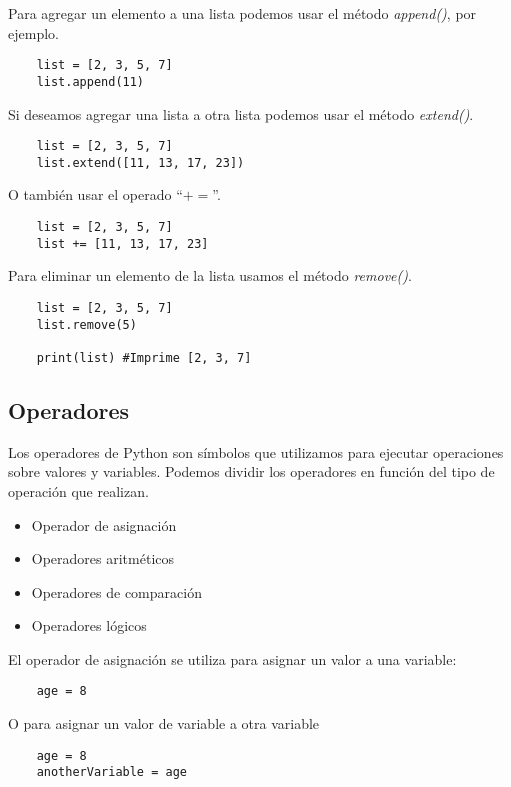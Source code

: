\documentclass[12pt]{article}
\begin{document}
    Para agregar un elemento a una lista podemos usar el método \textit{append()}, por ejemplo.
    \begin{lstlisting}
    list = [2, 3, 5, 7]
    list.append(11)
    \end{lstlisting}

    Si deseamos agregar una lista a otra lista podemos usar el método \textit{extend()}.
    \begin{lstlisting}
    list = [2, 3, 5, 7]
    list.extend([11, 13, 17, 23])
    \end{lstlisting}

    O también usar el operado ``$+=$''.
    \begin{lstlisting}
    list = [2, 3, 5, 7]
    list += [11, 13, 17, 23]
    \end{lstlisting}

    Para eliminar un elemento de la lista usamos el método \textit{remove()}.
    \begin{lstlisting}
    list = [2, 3, 5, 7]
    list.remove(5)

    print(list) #Imprime [2, 3, 7]
    \end{lstlisting}


    \newpage

    \subsection{Operadores}

    Los operadores de Python son símbolos que utilizamos para ejecutar operaciones sobre valores y  variables.
    Podemos dividir los operadores en función del tipo de operación que realizan.
    \begin{itemize}
        \item Operador de asignación
        \item Operadores aritméticos
        \item Operadores de comparación
        \item Operadores lógicos
    \end{itemize}

    El operador de asignación se utiliza para asignar un valor a una variable:
    \begin{lstlisting}
    age = 8
    \end{lstlisting}
    O para asignar un valor de variable a otra variable
    \begin{lstlisting}
    age = 8
    anotherVariable = age
    \end{lstlisting}
\end{document}
